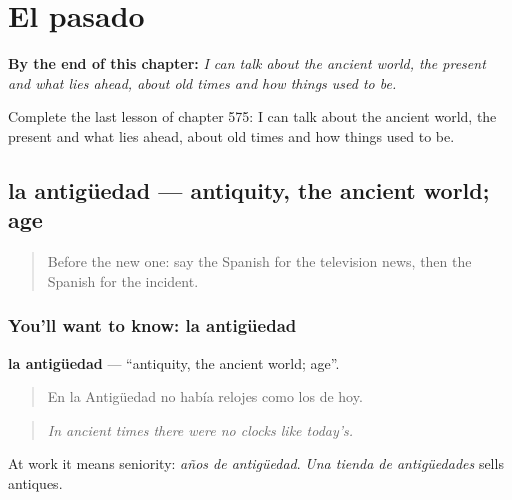 
\chapter{El pasado}
\label{ch:es-el-pasado}

\begin{chapteropening}
\textbf{By the end of this chapter:} \emph{I can talk about the ancient world, the present and what lies ahead, about old times and how things used to be.}

Complete the last lesson of chapter 575: I can talk about the ancient world, the present and what lies ahead, about old times and how things used to be.
\end{chapteropening}

\section[la antigüedad]{la antigüedad — antiquity, the ancient world; age}

\label{lesson:ES-C575-antiguedad}



\begin{quote}
Before the new one: say the Spanish for the television news, then the Spanish for the incident.
\end{quote}

\subsection*{You'll want to know: la antigüedad}
\textbf{la antigüedad} — \textquotedblleft{}antiquity, the ancient world; age\textquotedblright{}.

\begin{quote}
En la Antigüedad no había relojes como los de hoy.
\end{quote}

\begin{quote}
\emph{In ancient times there were no clocks like today's.}
\end{quote}

At work it means seniority: \emph{años de antigüedad}. \emph{Una tienda de antigüedades} sells antiques.

